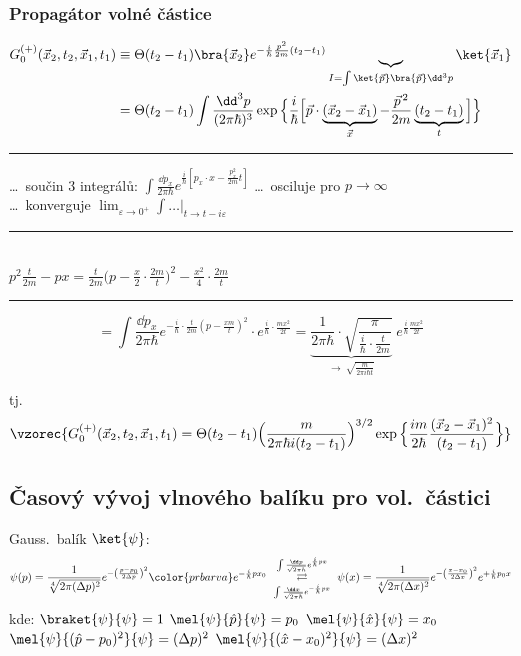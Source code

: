 \subsubsection*{Propagátor volné částice}
\begin{align*}
  G_0^{(+)}(\vec x_2,t_2,\vec x_1,t_1) &\equiv \Theta(t_2-t_1)\bra{\vec x_2}e^{-\frac{i}{\hbar}\frac{p^2}{2m}(t_2-t_1)}
     \underbrace{\phantom{I}}_{I = \int\ket{\vec p}\bra{\vec p}\dd^3p}\ket{\vec x_1} \\
  &= \Theta(t_2-t_1)\int\frac{\dd^3p}{(2\pi\hbar)^3}\exp\Big\{\frac{i}{\hbar}\Big[\vec p\cdot\underbrace{(\vec x_2-\vec x_1)}_{\vec x}
     - \frac{\vec p^{\,2}}{2m}\underbrace{(t_2-t_1)}_{t}\Big]\Big\}
\end{align*}
\noindent\rule{\linewidth}{0.3pt}
\dots\ součin 3 integrálů: \quad $\displaystyle\int\frac{\dd p_x}{2\pi\hbar}e^{\frac{i}{\hbar}[p_x\cdot x - \frac{p_x^2}{2m}t]}$
\quad \dots\ osciluje pro $p\to\infty$ \\
\hspace*{7cm} \dots\ konverguje $\lim_{\varepsilon\to 0^+}\int\dots\big|_{t\to t-i\varepsilon}$

\noindent\rule{0.6\linewidth}{0.3pt} \\
$p^2\frac{t}{2m} - px = \frac{t}{2m}\big(p - \frac{x}{2}\cdot\frac{2m}{t}\big)^2 - \frac{x^2}{4}\cdot\frac{2m}{t}$ \\
\noindent\rule{0.6\linewidth}{0.3pt}
\[
  = \int\frac{\dd p_x}{2\pi\hbar}e^{-\frac{i}{\hbar}\cdot\frac{t}{2m}(p - \frac{xm}{t})^2}\cdot e^{\frac{i}{\hbar}\cdot\frac{mx^2}{2t}}
  = \underbrace{\frac{1}{2\pi\hbar}\cdot\sqrt{\frac{\pi}{\frac{i}{\hbar}\cdot\frac{t}{2m}}}}_{\to\ \sqrt{\frac{m}{2\pi i\hbar t}}}\;e^{\frac{i}{\hbar}\frac{mx^2}{2t}}
\]

tj. \hspace{3cm} 
\[
  \vzorec{G_0^{(+)}(\vec x_2,t_2,\vec x_1,t_1) = \Theta(t_2-t_1)\Big(\frac{m}{2\pi\hbar i(t_2-t_1)}\Big)^{3/2}
  \exp\Big\{\frac{im}{2\hbar}\frac{(\vec x_2-\vec x_1)^2}{(t_2-t_1)}\Big\}}
\]

\subsection{Časový vývoj vlnového balíku pro vol.\ částici}
Gauss.\ balík $\ket{\psi}$:
\[
  \psi(p) = \frac{1}{\sqrt[4]{2\pi(\Delta p)^2}}e^{-\left(\frac{p-p_0}{2\Delta p}\right)^2}{\color{prbarva}e^{-\frac{i}{\hbar}px_0}}
  \ \underset{\int\frac{\dd x}{\sqrt{2\pi\hbar}}e^{-\frac{i}{\hbar}px}}{\overset{\int\frac{\dd p}{\sqrt{2\pi\hbar}}e^{\frac{i}{\hbar}px}}{\rightleftarrows}}\
  \psi(x) = \frac{1}{\sqrt[4]{2\pi(\Delta x)^2}}e^{-\left(\frac{x-x_0}{2\Delta x}\right)^2}e^{+\frac{i}{\hbar}p_0x}
\]
kde: \quad $\braket{\psi}{\psi} = 1$ \qquad $\mel{\psi}{\hat p}{\psi} = p_0$ \qquad $\mel{\psi}{\hat x}{\psi} = x_0$ \\[3pt]
\fbox{$\Delta x\cdot\Delta p = \frac{\hbar}{2}$} \qquad
$\mel{\psi}{(\hat p-p_0)^2}{\psi} = (\Delta p)^2$ \quad $\mel{\psi}{(\hat x-x_0)^2}{\psi} = (\Delta x)^2$

